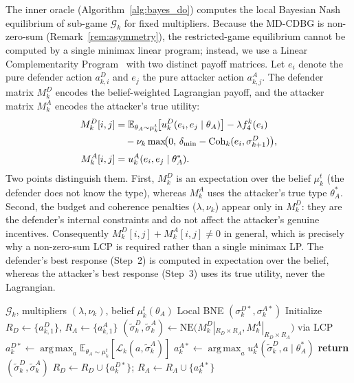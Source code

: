 \documentclass[conference]{IEEEtran}
\newcommand{\E}{\mathbb{E}}
\newcommand{\argmax}{\operatorname*{arg\,max}}
\newcommand{\Coh}{\mathrm{Coh}}
\begin{document}
The inner oracle (Algorithm~\ref{alg:bayes_do}) computes the local Bayesian Nash
equilibrium of sub-game $\mathcal{G}_k$ for fixed multipliers. Because the
MD-CDBG is non-zero-sum (Remark~\ref{rem:asymmetry}), the restricted-game
equilibrium cannot be computed by a single minimax linear program; instead, we
use a Linear Complementarity Program~\cite{lemke1964} with two distinct payoff
matrices. Let $e_i$ denote the pure defender action $a_{k,i}^D$ and $e_j$ the
pure attacker action $a_{k,j}^A$. The defender matrix $M_k^D$ encodes the
belief-weighted Lagrangian payoff, and the attacker matrix $M_k^A$ encodes the
attacker's true utility:
\begin{align}
M_k^D[i,j] &= \E_{\theta_A\sim\mu_k^t}\!\bigl[u_k^D(e_i,e_j\mid\theta_A)\bigr]
- \lambda f_4^k(e_i) \notag\\
&\quad - \nu_k\max\!\bigl(0,\,\delta_{\min}-\Coh_k(e_i,\sigma_{k+1}^D)\bigr),
\label{eq:MD}\\[2pt]
M_k^A[i,j] &= u_k^A(e_i,e_j\mid\theta_A^*).
\label{eq:MA}
\end{align}
Two points distinguish them. First, $M_k^D$ is an expectation over the
belief $\mu_k^t$ (the defender does not know the type), whereas $M_k^A$
uses the attacker's true type $\theta_A^*$. Second, the budget and
coherence penalties ($\lambda,\nu_k$) appear only in $M_k^D$: they are
the defender's internal constraints and do not affect the attacker's genuine
incentives. Consequently $M_k^D[i,j]+M_k^A[i,j]\neq 0$ in general, which is
precisely why a non-zero-sum LCP is required rather than a single minimax LP.
The defender's best response (Step~2) is computed in expectation over the
belief, whereas the attacker's best response (Step~3) uses its true utility,
never the Lagrangian.

\begin{algorithm}[t]
\caption{Bayes-DO: Bayesian Double Oracle for $\mathcal{G}_k$}
\label{alg:bayes_do}
\begin{algorithmic}[1]
\REQUIRE $\mathcal{G}_k$, multipliers $(\lambda,\nu_k)$, belief
$\mu_k^t(\theta_A)$
\ENSURE Local BNE $(\sigma_k^{D*},\sigma_k^{A*})$
\STATE Initialize $R_D\gets\{a_{k,1}^D\}$, $R_A\gets\{a_{k,1}^A\}$
\REPEAT
\STATE $(\tilde\sigma_k^D,\tilde\sigma_k^A)\gets\mathrm{NE}\big(M_k^D|_{R_D
\times R_A}, M_k^A|_{R_D\times R_A}\big)$ via LCP
\STATE $a_k^{D*}\gets\argmax_a \E_{\theta_A\sim\mu_k^t}
[\mathcal{L}_k(a,\tilde\sigma_k^A)]$
\STATE $a_k^{A*}\gets\argmax_a u_k^A(\tilde\sigma_k^D,a\mid\theta_A^*)$
\STATE \textbf{return} $(\tilde\sigma_k^D,\tilde\sigma_k^A)$
\ELSE
\STATE $R_D\gets R_D\cup\{a_k^{D*}\}$;\;\; $R_A\gets R_A\cup\{a_k^{A*}\}$
\ENDIF
{}
\end{algorithmic}
\end{algorithm}
\end{document}
